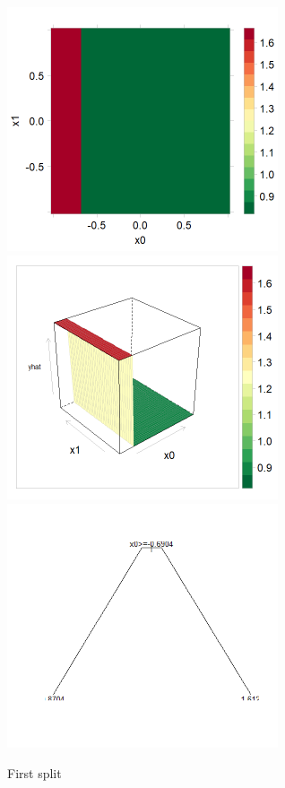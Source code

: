 \documentclass[10pt,openany]{article}
\numberwithin{definition}{section}
\numberwithin{example}{section}
\numberwithin{equation}{section}
\numberwithin{figure}{section}
\begin{document}
\begin{figure}
\noindent \begin{centering}
\includegraphics[width=80mm]{../fig/rpart-1-split-levelplot}~
\includegraphics[width=80mm]{../fig/rpart-1-split-wireframe}~
\includegraphics[width=80mm]{../fig/rpart-1-split-tree}
\par\end{centering}

\protect\caption{\label{fig:one-split}First split}
\end{figure}
\end{document}
